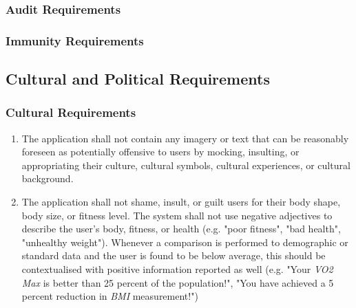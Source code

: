 \documentclass[12pt,letterpaper]{article}
\begin{document}
\subsubsection{Audit Requirements}
\label{ssub:audit_requirements}

\subsubsection{Immunity Requirements}
\label{ssub:immunity_requirements}


\subsection{Cultural and Political Requirements}
\label{sub:cultural_and_political_requirements}

\subsubsection{Cultural Requirements}
\label{ssub:cultural_requirements}
\begin{enumerate}[{CP-C}1. ]
	\item The application shall not contain any imagery or text that can be reasonably foreseen as potentially offensive to users by mocking, insulting, or appropriating their culture, cultural symbols, cultural experiences, or cultural background.
	
	\item The application shall not shame, insult, or guilt users for their body shape, body size, or fitness level. The system shall not use negative adjectives to describe the user's body, fitness, or health (e.g. "poor fitness", "bad health", "unhealthy weight"). Whenever a comparison is performed to demographic or standard data and the user is found to be below average, this should be contextualised with positive information reported as well (e.g. "Your \textit{VO2 Max} is better than 25 percent of the population!", "You have achieved a 5 percent reduction in\textit{ BMI} measurement!") 
\end{enumerate}
\end{document}
